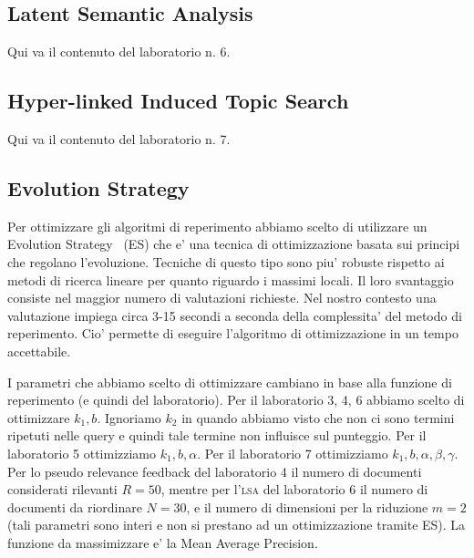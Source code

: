 \begin{enumerate}
\subsection{Latent Semantic Analysis}
\label{sec:lsa}

Qui va il contenuto del laboratorio n. 6.

\subsection{Hyper-linked Induced Topic Search}
\label{sec:hits}

Qui va il contenuto del laboratorio n. 7.

\subsection{Evolution Strategy}
\label{sec:es}

Per ottimizzare gli algoritmi di reperimento abbiamo scelto di utilizzare un Evolution Strategy~\cite{back1996evolutionary} (ES) che e' una tecnica di ottimizzazione basata sui principi che regolano l'evoluzione. Tecniche di questo tipo sono piu' robuste rispetto ai metodi di ricerca lineare per quanto riguardo i massimi locali. Il loro svantaggio consiste nel maggior numero di valutazioni richieste. Nel nostro contesto una valutazione impiega circa 3-15 secondi a seconda della complessita' del metodo di reperimento. Cio' permette di eseguire l'algoritmo di ottimizzazione in un tempo accettabile.

I parametri che abbiamo scelto di ottimizzare cambiano in base alla funzione di reperimento (e quindi del laboratorio). Per il laboratorio 3, 4, 6 abbiamo scelto di ottimizzare $k_1, b$. Ignoriamo $k_2$ in quando abbiamo visto che non ci sono termini ripetuti nelle query e quindi tale termine non influisce sul punteggio. Per il laboratorio 5 ottimizziamo $k_1, b, \alpha$. Per il laboratorio 7 ottimizziamo $k_1, b, \alpha, \beta, \gamma$. Per lo pseudo relevance feedback del laboratorio 4 il numero di documenti considerati rilevanti $R = 50$, mentre per l'\textsc{lsa} del laboratorio 6 il numero di documenti da riordinare $N = 30$, e il numero di dimensioni per la riduzione $m=2$ (tali parametri sono interi e non si prestano ad un ottimizzazione tramite ES). La funzione da massimizzare e' la Mean Average Precision.


\end{enumerate}
